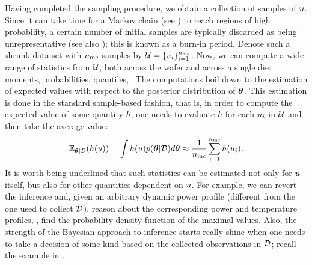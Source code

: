 Having completed the sampling procedure, we obtain a collection of samples of $u$. Since it can take time for a Markov chain (see ) to reach regions of high probability, a certain number of initial samples are typically discarded as being unrepresentative (see also ); this is known as a burn-in period. Denote such a shrunk data set with ${n_\text{mc}}$ samples by $\mathcal{U} = \{ u_i \}_{i = 1}^{n_\text{mc}}$. Now, we can compute a wide range of statistics from $\mathcal{U}$, both across the wafer and across a single die: moments, probabilities, quantiles, \etc\ The computations boil down to the estimation of expected values with respect to the posterior distribution of ${\boldsymbol\theta}$. This estimation is done in the standard sample-based fashion, that is, in order to compute the expected value of some quantity $h$, one needs to evaluate $h$ for each $u_i$ in $\mathcal{U}$ and then take the average value:
\[
  \E_{\vparam | \Data}(h(\u)) = \int h(\u) \f{\vparam | \Data} d\vparam \approx \frac{1}{\nsamples} \sum_{i = 1}^\nsamples h(\u_i).
\]
It is worth being underlined that such statistics can be estimated not only for $u$ itself, but also for other quantities dependent on $u$. For example, we can revert the inference and, given an arbitrary dynamic power profile (different from the one used to collect $\mathcal{D}$), reason about the corresponding power and temperature profiles, \eg, find the probability density function of the maximal values. Also, the strength of the Bayesian approach to inference starts really shine when one needs to take a decision of some kind based on the collected observations in $\mathcal{D}$; recall the example in .
